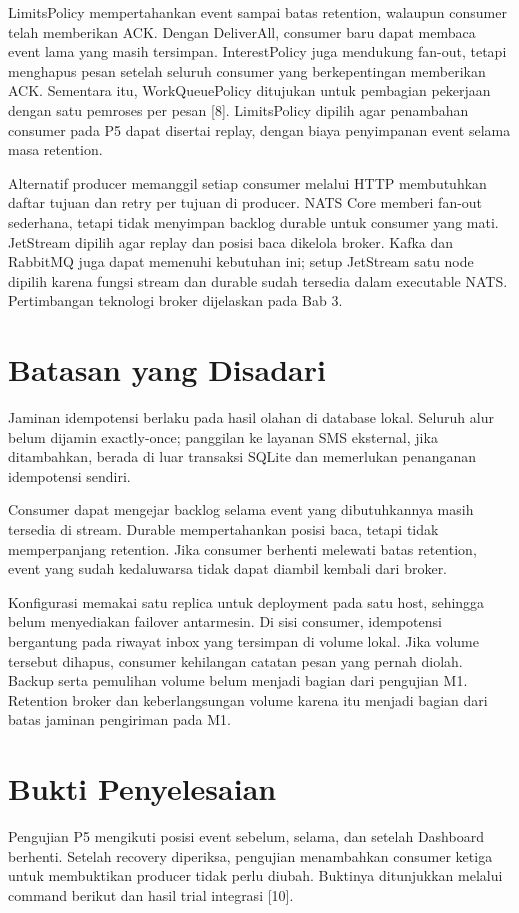 LimitsPolicy mempertahankan event sampai batas retention, walaupun consumer telah memberikan ACK. Dengan DeliverAll, consumer baru dapat membaca event lama yang masih tersimpan. InterestPolicy juga mendukung fan-out, tetapi menghapus pesan setelah seluruh consumer yang berkepentingan memberikan ACK. Sementara itu, WorkQueuePolicy ditujukan untuk pembagian pekerjaan dengan satu pemroses per pesan [8]. LimitsPolicy dipilih agar penambahan consumer pada P5 dapat disertai replay, dengan biaya penyimpanan event selama masa retention.

Alternatif producer memanggil setiap consumer melalui HTTP membutuhkan daftar tujuan dan retry per tujuan di producer. NATS Core memberi fan-out sederhana, tetapi tidak menyimpan backlog durable untuk consumer yang mati. JetStream dipilih agar replay dan posisi baca dikelola broker. Kafka dan RabbitMQ juga dapat memenuhi kebutuhan ini; setup JetStream satu node dipilih karena fungsi stream dan durable sudah tersedia dalam executable NATS. Pertimbangan teknologi broker dijelaskan pada Bab 3.

\section{Batasan yang Disadari}
Jaminan idempotensi berlaku pada hasil olahan di database lokal. Seluruh alur belum dijamin exactly-once; panggilan ke layanan SMS eksternal, jika ditambahkan, berada di luar transaksi SQLite dan memerlukan penanganan idempotensi sendiri.

Consumer dapat mengejar backlog selama event yang dibutuhkannya masih tersedia di stream. Durable mempertahankan posisi baca, tetapi tidak memperpanjang retention. Jika consumer berhenti melewati batas retention, event yang sudah kedaluwarsa tidak dapat diambil kembali dari broker.

Konfigurasi memakai satu replica untuk deployment pada satu host, sehingga belum menyediakan failover antarmesin. Di sisi consumer, idempotensi bergantung pada riwayat inbox yang tersimpan di volume lokal. Jika volume tersebut dihapus, consumer kehilangan catatan pesan yang pernah diolah. Backup serta pemulihan volume belum menjadi bagian dari pengujian M1. Retention broker dan keberlangsungan volume karena itu menjadi bagian dari batas jaminan pengiriman pada M1.

\section{Bukti Penyelesaian}
Pengujian P5 mengikuti posisi event sebelum, selama, dan setelah Dashboard berhenti. Setelah recovery diperiksa, pengujian menambahkan consumer ketiga untuk membuktikan producer tidak perlu diubah. Buktinya ditunjukkan melalui command berikut dan hasil trial integrasi [10].

